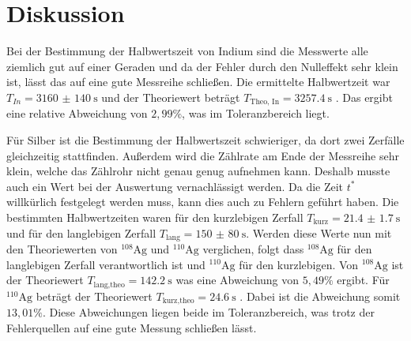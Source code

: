 \section{Diskussion}
Bei der Bestimmung der Halbwertszeit von Indium sind die Messwerte alle ziemlich
gut auf einer Geraden und da der Fehler durch den Nulleffekt sehr klein ist, lässt
das auf eine gute Messreihe schließen. Die ermittelte Halbwertzeit war
$T_{In} = \SI{3160(140)}{\second}$ und der Theoriewert beträgt $T_\text{Theo, In}
= \SI{3257.4}{\second}$ \cite{2}. Das ergibt eine relative Abweichung von $2,99 \%$,
was im Toleranzbereich liegt.

Für Silber ist die Bestimmung der Halbwertszeit schwieriger, da dort zwei Zerfälle
gleichzeitig stattfinden. Außerdem wird die Zählrate am Ende der Messreihe sehr
klein, welche das Zählrohr nicht genau genug aufnehmen kann. Deshalb musste auch ein
Wert bei der Auswertung vernachlässigt werden. Da die Zeit $t^*$ willkürlich festgelegt
werden muss, kann dies auch zu Fehlern geführt haben.
Die bestimmten Halbwertzeiten waren für den kurzlebigen Zerfall $T_\text{kurz} = \SI{21.4(17)}{\second}$
und für den langlebigen Zerfall $T_\text{lang} = \SI{150(80)}{\second}$.
Werden diese Werte nun mit den Theoriewerten von $^{108}\text{Ag}$ und $^{110}\text{Ag}$ verglichen,
folgt dass $^{108}\text{Ag}$ für den langlebigen Zerfall verantwortlich ist und $^{110}\text{Ag}$
für den kurzlebigen.
Von $^{108}\text{Ag}$ ist der Theoriewert $T_\text{lang,theo} = \SI{142.2}{\second}$ \cite{2} was eine
Abweichung von $5,49 \%$ ergibt.
Für $^{110}\text{Ag}$ beträgt der Theoriewert $T_\text{kurz,theo} = \SI{24.6}{\second}$ \cite{2}.
Dabei ist die Abweichung somit $13,01 \%$.
Diese Abweichungen liegen beide im Toleranzbereich, was trotz der Fehlerquellen auf
eine gute Messung schließen lässt.
